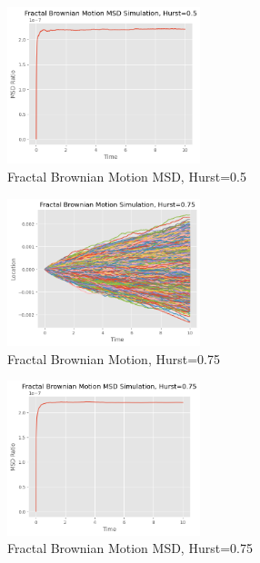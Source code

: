 \documentclass{article}
\begin{document}
\begin{enumerate}
\begin{figure}[h]
\end{figure}
\begin{figure}[h]
\caption{Fractal Brownian Motion MSD, Hurst=0.5}
\centering
\includegraphics[width=0.5\textwidth]{fbm_msd_0.5.png}
\end{figure}
\begin{figure}[h]
\caption{Fractal Brownian Motion, Hurst=0.75}
\centering
\includegraphics[width=0.5\textwidth]{fractal_brownian_motion_simulation_0.75.png}
\end{figure}
\begin{figure}[h]
\caption{Fractal Brownian Motion MSD, Hurst=0.75}
\centering
\includegraphics[width=0.5\textwidth]{fbm_msd_0.75.png}
\end{figure}
\end{enumerate}
\end{document}
